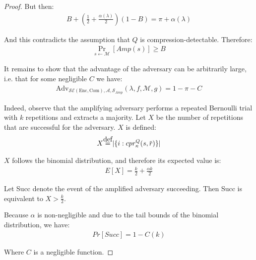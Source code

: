 \begin{proof}
But then:
\begin{align*}
    B + (\frac{1}{2} + \frac{\alpha(\lambda)}{2})(1 - B) =
    \pi + \alpha(\lambda)
\end{align*}

And this contradicts the assumption that $Q$ is compression-detectable. Therefore:
\begin{align*}
    \Pr_{s \leftarrow \mathcal{M}}
    [Amp(s)] \geq B
\end{align*}

It remains to show that the advantage of the adversary can be
arbitrarily large, i.e. that for some negligible $C$ we have:
\begin{align*}
    \text{Adv}_{\mathcal{SE}(\textrm{Enc}, \textrm{Com}), \mathcal{A}, \mathcal{S}_{Amp}}
    (\lambda, f, \mathcal{M}, g) = 1 - \pi - C
\end{align*}

Indeed, observe that the amplifying adversary performs a repeated Bernoulli
trial with $k$ repetitions and extracts a majority. Let $X$ be the number of
repetitions that are successful for the adversary. $X$ is defined:
\begin{align*}
    X \defeq |\{ i: cpr^Q_{\kappa}(s, \overbar{r}) \}|
\end{align*}

$X$ follows the binomial distribution, and therefore its expected value is:
\begin{align*}
    E[X] = \frac{k}{2} + \frac{\alpha k}{2}
\end{align*}

Let Succ denote the event of the amplified adversary succeeding. Then Succ
is equivalent to $X > \frac{k}{2}$.

Because $\alpha$ is non-negligible and due to the tail bounds of the binomial
distribution, we have:
\begin{align*}
    Pr[Succ] = 1 - C(k)
\end{align*}

Where $C$ is a negligible function.
\end{proof}
